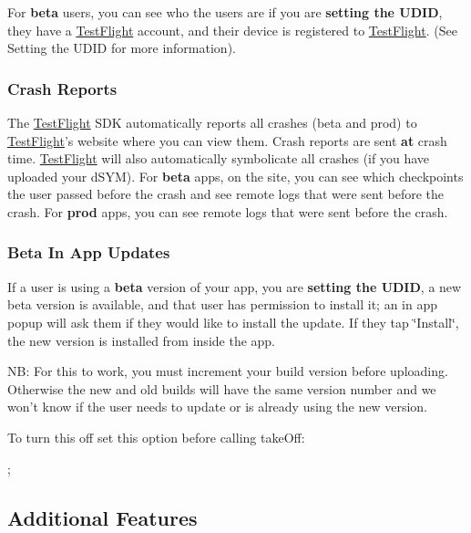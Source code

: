 For {\bfseries beta} users, you can see who the users are if you are {\bfseries setting the U\-D\-I\-D}, they have a \hyperlink{interface_test_flight}{Test\-Flight} account, and their device is registered to \hyperlink{interface_test_flight}{Test\-Flight}. (See Setting the U\-D\-I\-D for more information).

\subsubsection*{Crash Reports}

The \hyperlink{interface_test_flight}{Test\-Flight} S\-D\-K automatically reports all crashes (beta and prod) to \hyperlink{interface_test_flight}{Test\-Flight}'s website where you can view them. Crash reports are sent {\bfseries at} crash time. \hyperlink{interface_test_flight}{Test\-Flight} will also automatically symbolicate all crashes (if you have uploaded your d\-S\-Y\-M). For {\bfseries beta} apps, on the site, you can see which checkpoints the user passed before the crash and see remote logs that were sent before the crash. For {\bfseries prod} apps, you can see remote logs that were sent before the crash.

\subsubsection*{Beta In App Updates}

If a user is using a {\bfseries beta} version of your app, you are {\bfseries setting the U\-D\-I\-D}, a new beta version is available, and that user has permission to install it; an in app popup will ask them if they would like to install the update. If they tap \char`\"{}\-Install\char`\"{}, the new version is installed from inside the app.

N\-B\-: For this to work, you must increment your build version before uploading. Otherwise the new and old builds will have the same version number and we won't know if the user needs to update or is already using the new version.

To turn this off set this option before calling {\ttfamily take\-Off\-:} \begin{DoxyVerb}[TestFlight setOptions: TFOptionDisableInAppUpdates : @YES }];
\end{DoxyVerb}


\subsection*{Additional Features}

